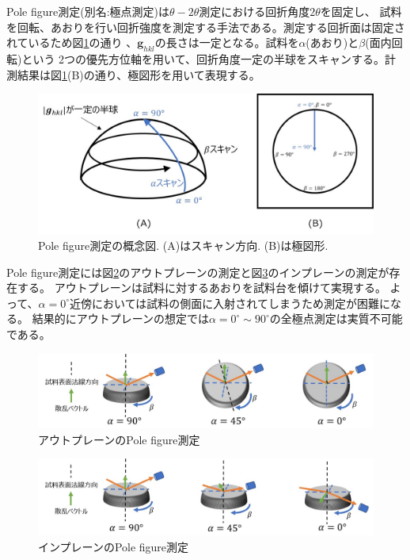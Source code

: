 \documentclass[dvipdfmx,12pt,a4paper]{jreport}
\begin{document}
			Pole figure測定(別名:極点測定)は$\theta-2\theta$測定における回折角度$2\theta$を固定し、
			試料を回転、あおりを行い回折強度を測定する手法である。測定する回折面は固定されているため図\ref{極点の測定方法}の通り
			、$\bm{g}_{hkl}$の長さは一定となる。試料を$\alpha$(あおり)と$\beta$(面内回転)という
			2つの優先方位軸を用いて、回折角度一定の半球をスキャンする。計測結果は図\ref{極点の測定方法}(B)の通り、極図形を用いて表現する。
			\begin{figure}[h]
				\centering
				\includegraphics[scale=0.8]{極点の測定方法.jpg}
				\caption{Pole figure測定の概念図. (A)はスキャン方向. (B)は極図形.}
				\label{極点の測定方法}
			\end{figure}
			\newpage
			Pole figure測定には図\ref{Pole_figure_outplane}のアウトプレーンの測定と図\ref{Pole_figure_inplane}のインプレーンの測定が存在する。
			アウトプレーンは試料に対するあおりを試料台を傾けて実現する。
			よって、$\alpha=0^{\circ}$近傍においては試料の側面に入射されてしまうため測定が困難になる。
			結果的にアウトプレーンの想定では$\alpha=0^{\circ}\sim90^{\circ}$の全極点測定は実質不可能である。
			\begin{figure}[h]
				\centering
				\includegraphics[width=0.9\linewidth]{pole_figure_outplane.jpg}
				\caption{アウトプレーンのPole figure測定}
				\label{Pole_figure_outplane}
			\end{figure}
			\begin{figure}[h]
				\centering
				\includegraphics[width=0.9\linewidth]{pole_figure_inplane.jpg}
				\caption{インプレーンのPole figure測定}
				\label{Pole_figure_inplane}
			\end{figure}
			\newpage
\end{document}
